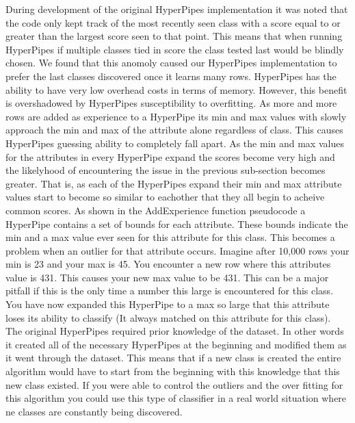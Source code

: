 During development of the original HyperPipes implementation it was noted 
that the code only kept track of the most recently seen class with a score 
equal to or greater than the largest score seen to that point. This means
that when running HyperPipes if multiple classes tied in score the class
tested last would be blindly chosen. We found that this anomoly caused our 
HyperPipes implementation to prefer the last classes discovered once it 
learns many rows.
HyperPipes has the ability to have very low overhead costs in terms of 
memory. However, this benefit is overshadowed by HyperPipes susceptibility 
to overfitting. As more and more rows are added as experience to a HyperPipe 
its min and max values with slowly approach the min and max of the attribute 
alone regardless of class. This causes HyperPipes guessing ability to 
completely fall apart. As the min and max values for the attributes in every
HyperPipe expand the scores become very high and the likelyhood of 
encountering the issue in the previous sub-section becomes greater. That is, 
as each of the HyperPipes expand their min and max attribute values start to 
become so similar to eachother that they all begin to acheive common scores.
As shown in the AddExperience function pseudocode a HyperPipe contains a set 
of bounds for each attribute. These bounds indicate the min and a max value 
ever seen for this attribute for this class. This becomes a problem when an 
outlier for that attribute occurs. Imagine after 10,000 rows your min is 23 
and your max is 45. You encounter a new row where this attributes value is 
431. This causes your new max value to be 431. This can be a major pitfall 
if this is the only time a number this large is encountered for this class. 
 You have now expanded this HyperPipe to a max so large that this attribute 
loses its ability to classify (It always matched on this attribute for this 
class).
The original HyperPipes required prior knowledge of the dataset. In other 
words it created all of the necessary HyperPipes at the beginning and 
modified them as it went through the dataset. This means that if a new class 
is created the entire algorithm would have to start from the beginning with 
this knowledge that this new class existed. If you were able to control the
outliers and the over fitting for this algorithm you could use this type of 
classifier in a real world situation where ne classes are constantly being 
discovered. 